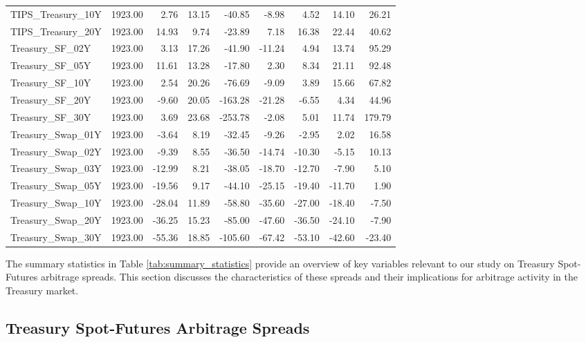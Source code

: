 \documentclass{article}
\begin{document}
\begin{table}[H]
\begin{adjustbox}{max width=\textwidth}
\begin{tabular}{lrrrrrrrr}
TIPS\_Treasury\_10Y & 1923.00 & 2.76 & 13.15 & -40.85 & -8.98 & 4.52 & 14.10 & 26.21 \\
TIPS\_Treasury\_20Y & 1923.00 & 14.93 & 9.74 & -23.89 & 7.18 & 16.38 & 22.44 & 40.62 \\
Treasury\_SF\_02Y & 1923.00 & 3.13 & 17.26 & -41.90 & -11.24 & 4.94 & 13.74 & 95.29 \\
Treasury\_SF\_05Y & 1923.00 & 11.61 & 13.28 & -17.80 & 2.30 & 8.34 & 21.11 & 92.48 \\
Treasury\_SF\_10Y & 1923.00 & 2.54 & 20.26 & -76.69 & -9.09 & 3.89 & 15.66 & 67.82 \\
Treasury\_SF\_20Y & 1923.00 & -9.60 & 20.05 & -163.28 & -21.28 & -6.55 & 4.34 & 44.96 \\
Treasury\_SF\_30Y & 1923.00 & 3.69 & 23.68 & -253.78 & -2.08 & 5.01 & 11.74 & 179.79 \\
Treasury\_Swap\_01Y & 1923.00 & -3.64 & 8.19 & -32.45 & -9.26 & -2.95 & 2.02 & 16.58 \\
Treasury\_Swap\_02Y & 1923.00 & -9.39 & 8.55 & -36.50 & -14.74 & -10.30 & -5.15 & 10.13 \\
Treasury\_Swap\_03Y & 1923.00 & -12.99 & 8.21 & -38.05 & -18.70 & -12.70 & -7.90 & 5.10 \\
Treasury\_Swap\_05Y & 1923.00 & -19.56 & 9.17 & -44.10 & -25.15 & -19.40 & -11.70 & 1.90 \\
Treasury\_Swap\_10Y & 1923.00 & -28.04 & 11.89 & -58.80 & -35.60 & -27.00 & -18.40 & -7.50 \\
Treasury\_Swap\_20Y & 1923.00 & -36.25 & 15.23 & -85.00 & -47.60 & -36.50 & -24.10 & -7.90 \\
Treasury\_Swap\_30Y & 1923.00 & -55.36 & 18.85 & -105.60 & -67.42 & -53.10 & -42.60 & -23.40 \\
\bottomrule
\end{tabular}
\end{adjustbox}
\end{table}

The summary statistics in Table \ref{tab:summary_statistics} provide an overview of key variables relevant to our study on Treasury Spot-Futures arbitrage spreads. This section discusses the characteristics of these spreads and their implications for arbitrage activity in the Treasury market.

\subsection{Treasury Spot-Futures Arbitrage Spreads}
\end{document}
